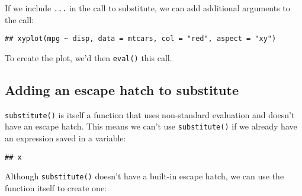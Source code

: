 If we include \texttt{...} in the call to substitute, we can add
additional arguments to the call:

\begin{Shaded}
\begin{Highlighting}[]
\StringTok{ }
  \NormalTok{(}\OperatorTok{~}\StringTok{ }
\NormalTok{\}}
 \NormalTok{, } \NormalTok{)}
\end{Highlighting}
\end{Shaded}

\begin{verbatim}
## xyplot(mpg ~ disp, data = mtcars, col = "red", aspect = "xy")
\end{verbatim}

To create the plot, we'd then \texttt{eval()} this call.

\hypertarget{adding-an-escape-hatch-to-substitute}{%
\subsection{Adding an escape hatch to
substitute}\label{adding-an-escape-hatch-to-substitute}}

\texttt{substitute()} is itself a function that uses non-standard
evaluation and doesn't have an escape hatch. This means we can't use
\texttt{substitute()} if we already have an expression saved in a
variable: 

\begin{Shaded}
\begin{Highlighting}[]
\StringTok{ }\OperatorTok{+}\StringTok{ }
\NormalTok{(} \NormalTok{, } \NormalTok{))}
\end{Highlighting}
\end{Shaded}

\begin{verbatim}
## x
\end{verbatim}

Although \texttt{substitute()} doesn't have a built-in escape hatch, we
can use the function itself to create one:

